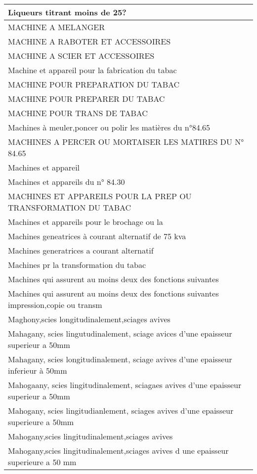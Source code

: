 \documentclass[
]{book}
\begin{document}
\begin{table}
\begin{tabular}[t]{l}
\hline
Liqueurs titrant moins de 25?\\
\hline
MACHINE A MELANGER\\
\hline
MACHINE A RABOTER ET ACCESSOIRES\\
\hline
MACHINE A SCIER ET ACCESSOIRES\\
\hline
Machine et appareil pour la fabrication du tabac\\
\hline
MACHINE POUR PREPARATION DU TABAC\\
\hline
MACHINE POUR PREPARER DU TABAC\\
\hline
MACHINE POUR TRANS DE TABAC\\
\hline
Machines à meuler,poncer ou polir les matières du n°84.65\\
\hline
MACHINES A PERCER OU MORTAISER LES MATIRES DU N° 84.65\\
\hline
Machines et appareil\\
\hline
Machines et appareils du n° 84.30\\
\hline
MACHINES ET APPAREILS POUR LA PREP OU TRANSFORMATION DU TABAC\\
\hline
Machines et appareils pour le brochage ou la\\
\hline
Machines geneatrices à courant alternatif de 75 kva\\
\hline
Machines generatrices a courant alternatif\\
\hline
Machines pr la transformation du tabac\\
\hline
Machines qui assurent au moins deux des fonctions suivantes\\
\hline
Machines qui assurent au moins deux des fonctions suivantes impression,copie ou transm\\
\hline
Maghony,scies longitudinalement,sciages avives\\
\hline
Mahagany, scies lingutudinalement, sciage avices d'une epaisseur superieur a 50mm\\
\hline
Mahagany, scies longitudinalement, sciage avives d'une epaisseur inferieur à 50mm\\
\hline
Mahogaany, scies lingitudinalement, sciagaes avives d'une epaisseur superieur a 50mm\\
\hline
Mahogany, scies lingitudianlement, sciages avives d'une epaisseur superieure a 50mm\\
\hline
Mahogany,scies lingitudinalement,sciages avives\\
\hline
Mahogany,scies lingitudinalement,sciages avives d une epaisseur superieure a 50 mm\\
\hline

\end{tabular}
\end{table}
\end{document}
